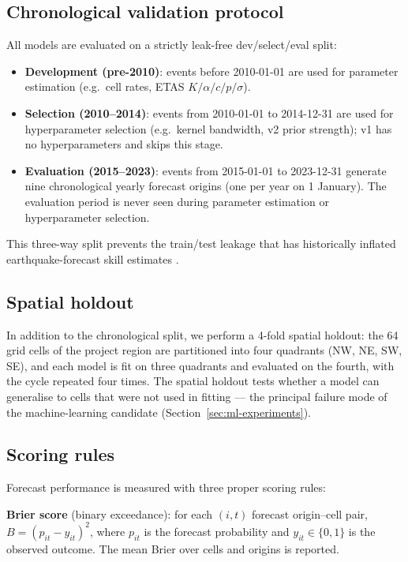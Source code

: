 \documentclass[10pt,a4paper,twocolumn]{article}
\begin{document}
\subsection{Chronological validation protocol}

All models are evaluated on a strictly leak-free dev/select/eval split:

\begin{itemize}[leftmargin=1.2em,itemsep=2pt,topsep=2pt]
\item \textbf{Development (pre-2010)}: events before 2010-01-01 are used for parameter estimation (e.g.\ cell rates, ETAS $K/\alpha/c/p/\sigma$).
\item \textbf{Selection (2010--2014)}: events from 2010-01-01 to 2014-12-31 are used for hyperparameter selection (e.g.\ kernel bandwidth, v2 prior strength); v1 has no hyperparameters and skips this stage.
\item \textbf{Evaluation (2015--2023)}: events from 2015-01-01 to 2023-12-31 generate nine chronological yearly forecast origins (one per year on 1 January). The evaluation period is never seen during parameter estimation or hyperparameter selection.
\end{itemize}

This three-way split prevents the train/test leakage that has historically inflated earthquake-forecast skill estimates \cite{marzocchi2012}.

\subsection{Spatial holdout}

In addition to the chronological split, we perform a 4-fold spatial holdout: the 64 grid cells of the project region are partitioned into four quadrants (NW, NE, SW, SE), and each model is fit on three quadrants and evaluated on the fourth, with the cycle repeated four times. The spatial holdout tests whether a model can generalise to cells that were not used in fitting --- the principal failure mode of the machine-learning candidate (Section~\ref{sec:ml-experiments}).

\subsection{Scoring rules}

Forecast performance is measured with three proper scoring rules:

\textbf{Brier score} (binary exceedance): for each $(i,t)$ forecast origin--cell pair, $B = (p_{it} - y_{it})^2$, where $p_{it}$ is the forecast probability and $y_{it}\in\{0,1\}$ is the observed outcome. The mean Brier over cells and origins is reported.
\end{document}
